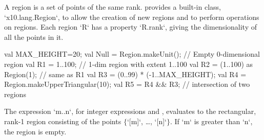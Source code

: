A region is a set of points of the same rank.  {}\Xten{}
provides a built-in class, \xcd`x10.lang.Region`, to allow the
creation of new regions and to perform operations on regions. 
Each region \xcd`R` has a property \xcd`R.rank`, giving the dimensionality of
all the points in it.

\begin{xten}
val MAX_HEIGHT=20;
val Null = Region.makeUnit();  // Empty 0-dimensional region
val R1 = 1..100; // 1-dim region with extent 1..100
val R2 = (1..100) as Region(1); // same as R1
val R3 = (0..99) * (-1..MAX_HEIGHT);
val R4 = Region.makeUpperTriangular(10);
val R5 = R4 && R3; // intersection of two regions
\end{xten}

The expression \xcdmath`m..n`, for integer expressions  and ,
evaluates to the rectangular, rank-1 region consisting of the points
$\{$\xcdmath`[m]`, \dots, \xcdmath`[n]`$\}$. If \xcdmath`m` is greater than
\xcdmath`n`, the region  is empty.




